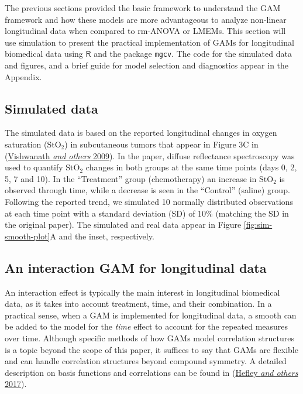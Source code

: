 \documentclass[
]{article}
\newcommand{\passthrough}[1]{#1}
\begin{document}
The previous sections provided the basic framework to understand the GAM framework and how these models are more advantageous to analyze non-linear longitudinal data when compared to rm-ANOVA or LMEMs. This section will use simulation to present the practical implementation of GAMs for longitudinal biomedical data using \(\textsf{R}\) and the package \passthrough{\lstinline!mgcv!}. The code for the simulated data and figures, and a brief guide for model selection and diagnostics appear in the Appendix.

\hypertarget{simulated-data}{%
\subsection{Simulated data}\label{simulated-data}}

The simulated data is based on the reported longitudinal changes in oxygen saturation (\(\mbox{StO}_2\)) in subcutaneous tumors that appear in Figure 3C in (\protect\hyperlink{ref-vishwanath2009}{Vishwanath \emph{and others} 2009}). In the paper, diffuse reflectance spectroscopy was used to quantify \(\mbox{StO}_2\) changes in both groups at the same time points (days 0, 2, 5, 7 and 10). In the ``Treatment'' group (chemotherapy) an increase in \(\mbox{StO}_2\) is observed through time, while a decrease is seen in the ``Control'' (saline) group. Following the reported trend, we simulated 10 normally distributed observations at each time point with a standard deviation (SD) of 10\% (matching the SD in the original paper).
The simulated and real data appear in Figure \ref{fig:sim-smooth-plot}A and the inset, respectively.

\hypertarget{an-interaction-gam-for-longitudinal-data}{%
\subsection{An interaction GAM for longitudinal data}\label{an-interaction-gam-for-longitudinal-data}}

An interaction effect is typically the main interest in longitudinal biomedical data, as it takes into account treatment, time, and their combination. In a practical sense, when a GAM is implemented for longitudinal data, a smooth can be added to the model for the \emph{time} effect to account for the repeated measures over time. Although specific methods of how GAMs model correlation structures is a topic beyond the scope of this paper, it suffices to say that GAMs are flexible and can handle correlation structures beyond compound symmetry. A detailed description on basis functions and correlations can be found in (\protect\hyperlink{ref-hefley2017}{Hefley \emph{and others} 2017}).
\end{document}
